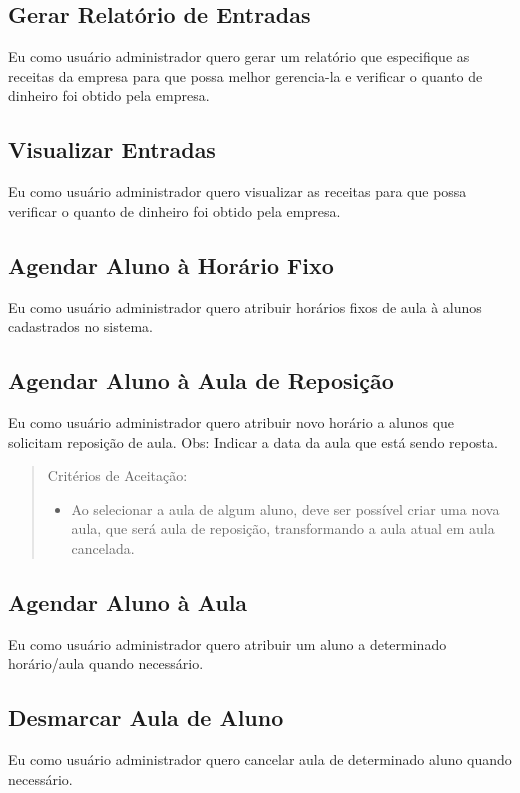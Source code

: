 \subsection[Gerar Relatório de Entradas]{Gerar Relatório de Entradas}
Eu como usuário administrador quero gerar um relatório que especifique as
receitas da empresa para que possa melhor gerencia-la e verificar o quanto de
dinheiro foi obtido pela empresa.

\subsection[Visualizar Entradas]{Visualizar Entradas}
Eu como usuário administrador quero visualizar as receitas para que possa
verificar o quanto de dinheiro foi obtido pela empresa.

\subsection[Agendar Aluno à Horário Fixo]{Agendar Aluno à Horário Fixo}
Eu como usuário administrador quero atribuir horários fixos de aula à alunos
cadastrados no sistema.

\subsection[Agendar Aluno à Aula de Reposição]{Agendar Aluno à Aula de Reposição}
Eu como usuário administrador quero atribuir novo horário a alunos que solicitam
reposição de aula. Obs: Indicar a data da aula que está sendo reposta.

\begin{quote}
Critérios de Aceitação:
    \begin{itemize}
        \item Ao selecionar a aula de algum aluno, deve ser possível criar uma nova aula,
        que será aula de reposição, transformando a aula atual em aula cancelada.
    \end{itemize}
\end{quote}

\subsection[Agendar Aluno à Aula]{Agendar Aluno à Aula}
Eu como usuário administrador quero atribuir um aluno a determinado
horário/aula quando necessário.

\subsection[Desmarcar Aula de Aluno]{Desmarcar Aula de Aluno}
Eu como usuário administrador quero cancelar aula de determinado aluno quando
necessário.

